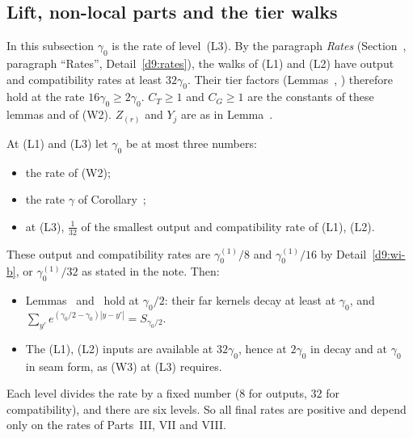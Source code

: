 \subsection{Lift, non-local parts and the tier walks}\label{d9:liftsec}

In this subsection $\gamma_0$ is the rate of level~(L3). By the paragraph \emph{Rates} (Section~, paragraph ``Rates'', Detail~\ref{d9:rates}), the walks of (L1) and (L2) have output and compatibility rates at least $32\gamma_0$. Their tier factors (Lemmas~, ) therefore hold at the rate $16\gamma_0\ge2\gamma_0$. $C_T\ge1$ and $C_G\ge1$ are the constants of these lemmas and of (W2). $Z_{(r)}$ and $Y_j$ are as in Lemma~.

\begin{detail}\label{d9:rates}
At (L1) and (L3) let $\gamma_0$ be at most three numbers:
\begin{itemize}
\item the rate of (W2);
\item the rate $\gamma$ of Corollary~;
\item at (L3), $\frac1{32}$ of the smallest output and compatibility rate of (L1), (L2).
\end{itemize}
These output and compatibility rates are $\gamma_0^{(1)}/8$ and $\gamma_0^{(1)}/16$ by Detail~\ref{d9:wi-b}, or $\gamma_0^{(1)}/32$ as stated in the note. Then:
\begin{itemize}
\item Lemmas~ and~ hold at $\gamma_0/2$: their far kernels decay at least at $\gamma_0$, and $\sum_{y'}e^{(\gamma_0/2-\gamma_0)|y-y'|}=S_{\gamma_0/2}$.
\item The (L1), (L2) inputs are available at $32\gamma_0$, hence at $2\gamma_0$ in decay and at $\gamma_0$ in seam form, as (W3) at (L3) requires.
\end{itemize}
Each level divides the rate by a fixed number ($8$ for outputs, $32$ for compatibility), and there are six levels. So all final rates are positive and depend only on the rates of Parts~III, VII and VIII.
\end{detail}


